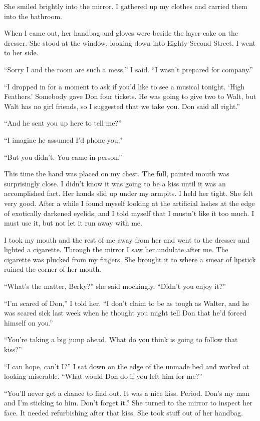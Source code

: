 \documentclass{novel}
\begin{document}
She smiled brightly into the mirror. I gathered up my clothes and carried them into the bathroom.

When I came out, her handbag and gloves were beside the layer cake on the dresser. She stood at the window, looking down into Eighty-Second Street. I went to her side.

“Sorry I and the room are such a mess,” I said. “I wasn’t prepared for company.”

“I dropped in for a moment to ask if you’d like to see a musical tonight. ‘High Feathers.’ Somebody gave Don four tickets. He was going to give two to Walt, but Walt has no girl friends, so I suggested that we take you. Don said all right.”

“And he sent you up here to tell me?”

“I imagine he assumed I’d phone you.”

“But you didn’t. You came in person.”

This time the hand was placed on my chest. The full, painted mouth was surprisingly close. I didn’t know it was going to be a kiss until it was an accomplished fact. Her hands slid up under my armpits. I held her tight. She felt very good. After a while I found myself looking at the artificial lashes at the edge of exotically darkened eyelids, and I told myself that I mustn’t like it too much. I must use it, but not let it run away with me.

\scenestars

I took my mouth and the rest of me away from her and went to the dresser and lighted a cigarette. Through the mirror I saw her undulate after me. The cigarette was plucked from my fingers. She brought it to where a smear of lipstick ruined the corner of her mouth.

“What’s the matter, Berky?” she said mockingly. “Didn’t you enjoy it?”

“I’m scared of Don,” I told her. “I don’t claim to be as tough as Walter, and he was scared sick last week when he thought you might tell Don that he’d forced himself on you.”

“You’re taking a big jump ahead. What do you think is going to follow that kiss?”

“I can hope, can’t I?” I sat down on the edge of the unmade bed and worked at looking miserable. “What would Don do if you left him for me?”

“You’ll never get a chance to find out. It was a nice kiss. Period. Don’s my man and I’m sticking to him. Don’t forget it.” She turned to the mirror to inspect her face. It needed refurbishing after that kiss. She took stuff out of her handbag.
\end{document}
